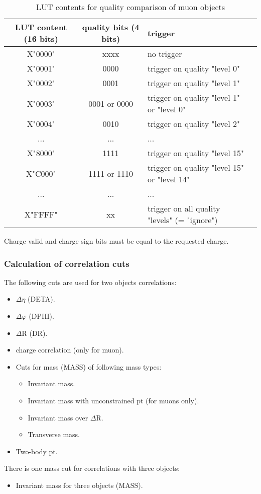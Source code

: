 \begin{table}
\caption{LUT contents for quality comparison of muon objects}
\vspace{5mm}
\centering
\begin{tabular}{|c|c|l|c|}\hline
LUT content (16 bits) & quality bits  (4 bits) & trigger \\\hline\hline
X"0000" & xxxx & no trigger\\\hline
X"0001" & 0000 & trigger on quality "level 0"\\\hline
X"0002" & 0001 & trigger on quality "level 1"\\\hline
X"0003" & 0001 or 0000 & trigger on quality "level 1" or "level 0"\\\hline
X"0004" & 0010 & trigger on quality "level 2"\\\hline
... & ...& ...\\\hline
X"8000" & 1111 & trigger on quality "level 15"\\\hline
X"C000" & 1111 or 1110 & trigger on quality "level 15" or "level 14"\\\hline
... & ...& ...\\\hline
X"FFFF" & xx & trigger on all quality "levels" (= "ignore")\\\hline
\end{tabular}
\label{tab:gtl:muon_lut_qual}
\end{table}

Charge valid and charge sign bits must be equal to the requested charge.\\

\clearpage

\subsubsection{Calculation of correlation cuts}
\label{sec:gtl:calc_corr_cuts}

The following cuts are used for two objects correlations:
\begin{itemize}
\item $\Delta\eta$ (DETA).
\item $\Delta\varphi$ (DPHI).
\item $\Delta$R (DR).
\item charge correlation (only for muon).
\item Cuts for mass (MASS) of following mass types:
  \begin{itemize}
  \item Invariant mass.
  \item Invariant mass with unconstrained pt (for muons only).
  \item Invariant mass over $\Delta$R.
  \item Transverse mass.
  \end{itemize}
\item Two-body pt.
\end{itemize}
There is one mass cut for correlations with three objects:
\begin{itemize}
\item Invariant mass for three objects (MASS).
\end{itemize}

